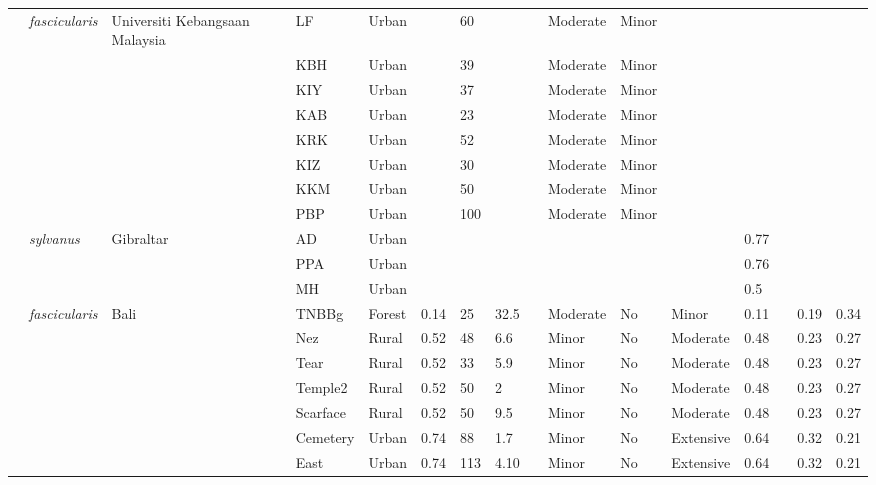 \documentclass{../../../coursework}
\begin{document}
\begin{landscape}
\begin{longtabu}{XXXXXXXXXXXXXX[0.1]XX}
                \hline \textcite{MdZain2011} & \textit{fascicularis} & Universiti Kebangsaan Malaysia & LF & Urban &  & 60 &  &  & Moderate & Minor &  &  &  &  &  \\
                    &  &  & KBH & Urban &  & 39 &  &  & Moderate & Minor &  &  &  &  &  \\
                    &  &  & KIY & Urban &  & 37 &  &  & Moderate & Minor &  &  &  &  &  \\
                    &  &  & KAB & Urban &  & 23 &  &  & Moderate & Minor &  &  &  &  &  \\
                    &  &  & KRK & Urban &  & 52 &  &  & Moderate & Minor &  &  &  &  &  \\
                    &  &  & KIZ & Urban &  & 30 &  &  & Moderate & Minor &  &  &  &  &  \\
                    &  &  & KKM & Urban &  & 50 &  &  & Moderate & Minor &  &  &  &  &  \\
                    &  &  & PBP & Urban &  & 100 &  &  & Moderate & Minor &  &  &  &  &  \\
                \hline \textcite{Sch121} & \textit{sylvanus} & Gibraltar & AD & Urban &  &  &  &  &  &  &  & 0.77 &  &  &  \\
                    &  &  & PPA & Urban &  &  &  &  &  &  &  & 0.76 &  &  &  \\
                    &  &  & MH & Urban &  &  &  &  &  &  &  & 0.5 &  &  &  \\
                \hline \textcite{Beh14} & \textit{fascicularis} & Bali & TNBBg & Forest & 0.14 & 25 & 32.5 &  & Moderate & No & Minor & 0.11 &  & 0.19 & 0.34 \\
                    &  &  & Nez & Rural & 0.52 & 48 & 6.6 &  & Minor & No & Moderate & 0.48 &  & 0.23 & 0.27 \\
                    &  &  & Tear & Rural & 0.52 & 33 & 5.9 &  & Minor & No & Moderate & 0.48 &  & 0.23 & 0.27 \\
                    &  &  & Temple2 & Rural & 0.52 & 50 & 2 &  & Minor & No & Moderate & 0.48 &  & 0.23 & 0.27 \\
                    &  &  & Scarface & Rural & 0.52 & 50 & 9.5 &  & Minor & No & Moderate & 0.48 &  & 0.23 & 0.27 \\
                    &  &  & Cemetery & Urban & 0.74 & 88 & 1.7 &  & Minor & No & Extensive & 0.64 &  & 0.32 & 0.21 \\
                    &  &  & East & Urban & 0.74 & 113 & 4.10 &  & Minor & No & Extensive & 0.64 &  & 0.32 & 0.21 \\

\end{longtabu}
\end{landscape}
\end{document}
